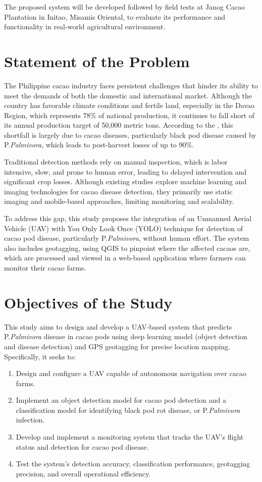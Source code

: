 {The proposed system will be developed followed by field tests at Janog Cacao Plantation in Initao, Misamis Oriental, to evaluate its performance and functionality in real-world agricultural environment.


\section{Statement of the Problem}

The Philippine cacao industry faces persistent challenges that hinder its ability to meet the demands of both the domestic and international market. Although the country has favorable climate conditions and fertile land, especially in the Davao Region, which represents 78\% of national production, it continues to fall short of its annual production target of 50,000 metric tons. According to the \cite{PhilCacaoRoadmap2021}, this shortfall is largely due to cacao diseases, particularly black pod disease caused by P.\textit{Palmivora}, which leads to post-harvest losses of up to 90\%.

Traditional detection methods rely on manual inspection, which is labor intensive, slow, and prone to human error, leading to delayed intervention and significant crop losses. Although existing studies explore machine learning and imaging technologies for cacao disease detection, they primarily use static imaging and mobile-based approaches, limiting monitoring and scalability.

To address this gap, this study proposes the integration of an Unmanned Aerial Vehicle (UAV) with You Only Look Once (YOLO) technique for detection of cacao pod disease, particularly P.\textit{Palmivora}, without human effort. The system also includes geotagging, using QGIS to pinpoint where the affected cacaos are, which are processed and viewed in a web-based application where farmers can monitor their cacao farms.

\section{Objectives of the Study}

This study aims to design and develop a UAV-based system that predicts P.\textit{Palmivora} disease in cacao pods using deep learning model (object detection and disease detection) and GPS geotagging for precise location mapping. Specifically, it seeks to:

\begin{enumerate}
	\item Design and configure a UAV capable of autonomous navigation over cacao farms.
	\item Implement an object detection model for cacao pod detection and a classification model for identifying black pod rot disease, or P.\textit{Palmivora} infection.
	\item Develop and implement a monitoring system that tracks the UAV’s flight status and detection for cacao pod disease.
	\item Test the system’s detection accuracy, classification performance, geotagging precision, and overall operational efficiency.
\end{enumerate}

}

